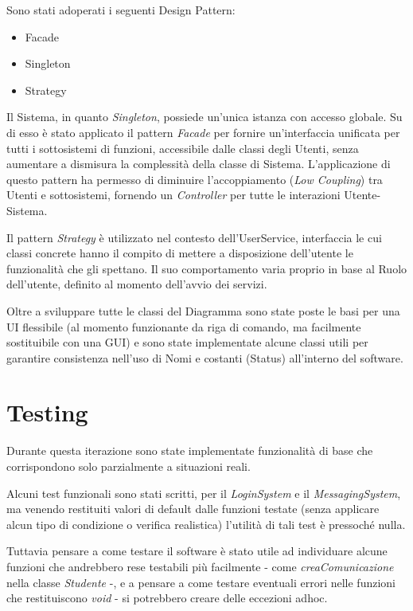 \documentclass[12pt]{report}
\begin{document}
	Sono stati adoperati i seguenti Design Pattern:
	\begin{itemize}
		\item Facade
		\item Singleton
		\item Strategy
	\end{itemize}
	
	Il Sistema, in quanto \textit{Singleton}, possiede un'unica istanza con accesso globale. Su di esso è stato applicato il pattern \textit{Facade} per fornire un'interfaccia unificata per tutti i  sottosistemi di funzioni, accessibile dalle classi degli Utenti, senza aumentare a dismisura la complessità della classe di Sistema. L'applicazione di questo pattern ha permesso di diminuire l'accoppiamento (\textit{Low Coupling}) tra Utenti e sottosistemi, fornendo un \textit{Controller} per tutte le interazioni Utente-Sistema.
	
	Il pattern \textit{Strategy} è utilizzato nel contesto dell'UserService, interfaccia le cui classi concrete hanno il compito di mettere a disposizione dell'utente le funzionalità che gli spettano. Il suo comportamento varia proprio in base al Ruolo dell'utente, definito al momento dell'avvio dei servizi.
	
	Oltre a sviluppare tutte le classi del Diagramma sono state poste le basi per una UI flessibile (al momento funzionante da riga di comando, ma facilmente sostituibile con una GUI) e sono state implementate alcune classi utili per garantire consistenza nell'uso di Nomi e costanti (Status) all'interno del software.
	
	\newpage
	
	
	\section{Testing}
	
	Durante questa iterazione sono state implementate funzionalità di base che corrispondono solo parzialmente a situazioni reali.
	
	Alcuni test funzionali sono stati scritti, per il \textit{LoginSystem} e il \textit{MessagingSystem}, ma venendo restituiti valori di default dalle funzioni testate (senza applicare alcun tipo di condizione o verifica realistica) l'utilità di tali test è pressoché nulla.
	
	Tuttavia pensare a come testare il software è stato utile ad individuare alcune funzioni che andrebbero rese testabili più facilmente - come \textit{creaComunicazione} nella classe \textit{Studente} -, e a pensare a come testare eventuali errori nelle funzioni che restituiscono \textit{void} - si potrebbero creare delle eccezioni adhoc.
	
\end{document}

